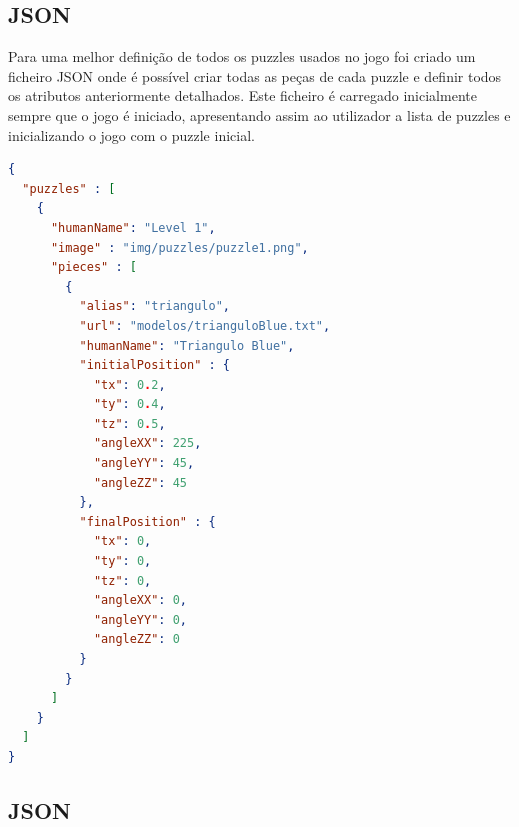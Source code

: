 \documentclass[pdftex,12pt,a4paper]{report}
\begin{document}
\subsection{JSON}

Para uma melhor definição de todos os puzzles usados no jogo foi criado um ficheiro JSON onde é possível criar todas as peças de cada puzzle e definir todos os atributos anteriormente detalhados. Este ficheiro é carregado inicialmente sempre que o jogo é iniciado, apresentando assim ao utilizador a lista de puzzles e inicializando o jogo com o puzzle inicial.

\begin{lstlisting}[language=json,firstnumber=1]
{
  "puzzles" : [
    {
      "humanName": "Level 1",
      "image" : "img/puzzles/puzzle1.png",
      "pieces" : [
        {
          "alias": "triangulo",
          "url": "modelos/trianguloBlue.txt",
          "humanName": "Triangulo Blue",
          "initialPosition" : {
            "tx": 0.2,
            "ty": 0.4,
            "tz": 0.5,
            "angleXX": 225,
            "angleYY": 45,
            "angleZZ": 45
          },
          "finalPosition" : {
            "tx": 0,
            "ty": 0,
            "tz": 0,
            "angleXX": 0,
            "angleYY": 0,
            "angleZZ": 0
          }
        }
      ]
    }
  ]
}
\end{lstlisting}

\subsection{JSON}
\end{document}
